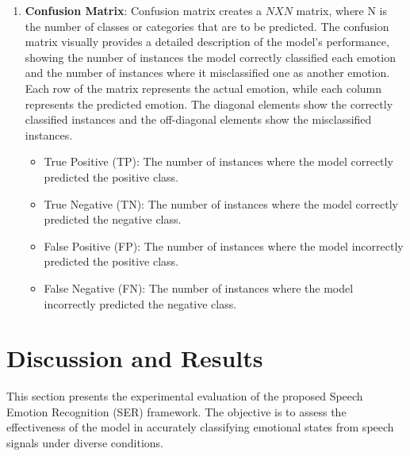 \documentclass[iicol,sn-mathphys-num]{sn-jnl}%
\theoremstyle{thmstyleone}%
\theoremstyle{thmstyletwo}%
\theoremstyle{thmstylethree}%
\begin{document}
\begin{enumerate}
\begin{itemize}
        \item \textbf{F1-Score}: F1-Score is a harmonic mean between recall and precision. The metric tells us how accurate (identifies the number of instances properly) and robust (does not miss any significant number of instances) our model is. It provides a balanced measure of model performance, especially when dealing with imbalanced classes in a dataset. The mathematical expression for F1-Score is as follows:
        \begin{equation}
        \text{F1-Score} = 2 \times \frac{\text{Precision} \times \text{Recall}}{\text{Precision} + \text{Recall}}
        \end{equation}
        Higher precision and lower recall can give you higher accuracy but miss a large number of instances.
        
    \end{itemize}
    
    \item \textbf{Confusion Matrix}: Confusion matrix creates a ${N X N}$ matrix, where N is the number of classes or categories that are to be predicted. The confusion matrix visually provides a detailed description of the model's performance, showing the number of instances the model correctly classified each emotion and the number of instances where it misclassified one as another emotion. Each row of the matrix represents the actual emotion, while each column represents the predicted emotion. The diagonal elements show the correctly classified instances and the off-diagonal elements show the misclassified instances.
    \begin{itemize}
        \item True Positive (TP): The number of instances where the model correctly predicted the positive class.
        \item True Negative (TN): The number of instances where the model correctly predicted the negative class.
        \item False Positive (FP): The number of instances where the model incorrectly predicted the positive class.
        \item False Negative (FN): The number of instances where the model incorrectly predicted the negative class.
    \end{itemize}

\end{enumerate}
\fi
\section{Discussion and Results}\label{sec4}
This section presents the experimental evaluation of the proposed Speech Emotion Recognition (SER) framework. The objective is to assess the effectiveness of the model in accurately classifying emotional states from speech signals under diverse conditions.
\end{document}
